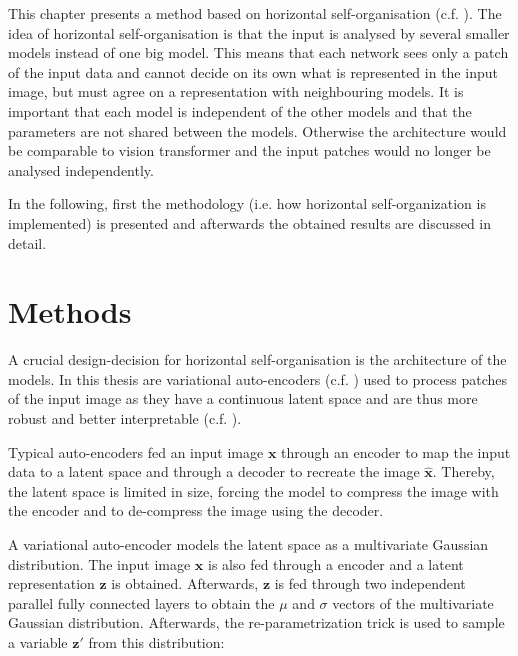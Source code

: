 This chapter presents a method based on horizontal self-organisation (c.f. ).
The idea of horizontal self-organisation is that the input is analysed by several smaller models instead of one big model.
This means that each network sees only a patch of the input data and cannot decide on its own what is represented in the input image, but must agree on a representation with neighbouring models.
It is important that each model is independent of the other models and that the parameters are not shared between the models. Otherwise the architecture would be comparable to vision transformer  and the input patches would no longer be analysed independently.


In the following, first the methodology (i.e. how horizontal self-organization is implemented) is presented and afterwards the obtained results are discussed in detail.


\section{Methods}
A crucial design-decision for horizontal self-organisation is the architecture of the models.
In this thesis are variational auto-encoders  (c.f. ) used to process patches of the input image as they have a continuous latent space and are thus more robust and better interpretable (c.f. ).

Typical auto-encoders fed an input image $\boldsymbol{x}$ through an encoder to map the input data to a latent space and through a decoder to recreate the image $\boldsymbol{\hat{x}}$. Thereby, the latent space is limited in size, forcing the model to compress the image with the encoder and to de-compress the image using the decoder.

A variational auto-encoder models the latent space as a multivariate Gaussian distribution. The input image $\boldsymbol{x}$ is also fed through a encoder and a latent representation $\boldsymbol{z}$ is obtained. Afterwards, $\boldsymbol{z}$ is fed through two independent parallel fully connected layers to obtain the $\mu$ and $\sigma$ vectors of the multivariate Gaussian distribution. Afterwards, the re-parametrization trick is used to sample a variable $\boldsymbol{z}'$ from this distribution:

